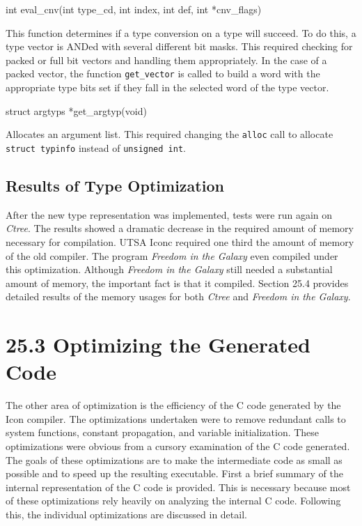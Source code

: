 {\ttfamily\mdseries
int eval\_cnv(int type\_cd, int index, int def, int *cnv\_flags)}

This function determines if a type conversion on a type will
succeed. To do this, a type vector is ANDed with several different bit
masks. This required checking for packed or full bit vectors and
handling them appropriately. In the case of a packed vector, the
function \texttt{get\_vector} is called to build a word with the
appropriate type bits set if they fall in the selected word of the
type vector.

{\ttfamily\mdseries
struct argtyps *get\_argtyp(void)}

Allocates an argument list. This required changing the
\texttt{alloc} call to allocate \texttt{struct typinfo} instead of
\texttt{unsigned int}.

\subsection{Results of Type Optimization}

After the new type representation was implemented, tests were run
again on \textit{Ctree}. The results showed a dramatic decrease in the
required amount of memory necessary for compilation. UTSA Iconc
required one third the amount of memory of the old compiler. The
program \textit{Freedom in the Galaxy} even compiled under this
optimization.  Although \textit{Freedom in the Galaxy} still needed a
substantial amount of memory, the important fact is that it
compiled. Section 25.4 provides detailed results of the memory
usages for both \textit{Ctree} and \textit{Freedom in the Galaxy}.

\section[25.3 Optimizing the Generated Code]{25.3 Optimizing the Generated Code}

The other area of optimization is the efficiency of the C code
generated by the Icon compiler. The optimizations undertaken were to
remove redundant calls to system functions, constant propagation, and
variable initialization. These optimizations were obvious from a
cursory examination of the C code generated. The goals of these
optimizations are to make the intermediate code as small as possible
and to speed up the resulting executable. First a brief summary of
the internal representation of the C code is provided. This is
necessary because most of these optimizations rely heavily on
analyzing the internal C code. Following this, the individual
optimizations are discussed in detail.

